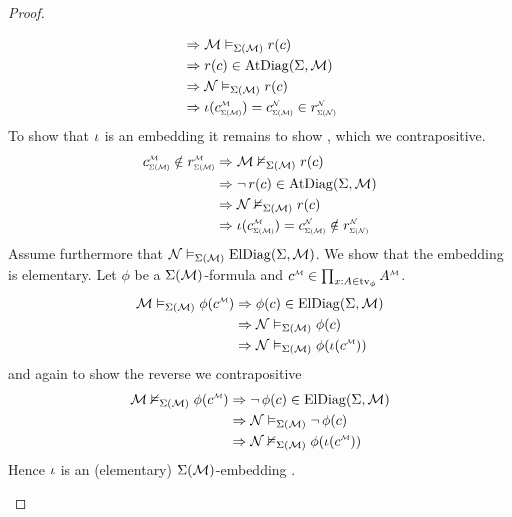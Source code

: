 \begin{proof}
\begin{forward}
\begin{align*}
            &\implies \MM \model{\Si(\MM)} r(c)\\
            &\implies r(c) \in \atdiag{\Si}{\MM}\\
            &\implies \NN \model{\Si(\MM)} r(c) \\
            &\implies \io(\subintp{\Si(\MM)}{\MM}{c}) = 
            \subintp{\Si(\MM)}{\NN}{c} \in \subintp{\Si(\NN)}{\NN}{r} 
        \end{align*}
        To show that $\iota$ is an embedding it remains to show 
        , which we contrapositive.
        \begin{align*}
            \subintp{\Si(\MM)}{\MM}{c} \notin \subintp{\Si(\MM)}{\MM}{r} 
            &\implies \MM \nodel{\Si(\MM)} r(c)\\
            &\implies \NOT r(c) \in \atdiag{\Si}{\MM}\\
            &\implies \NN \nodel{\Si(\MM)} r(c) \\
            &\implies \io(\subintp{\Si(\MM)}{\MM}{c}) = 
            \subintp{\Si(\MM)}{\NN}{c} \notin \subintp{\Si(\NN)}{\NN}{r} 
        \end{align*}
        Assume furthermore that $\mathcal{N} \vDash_{\Sigma(\mathcal{M})} \mathrm{ElDiag}(\Sigma,\mathcal{M})$.
        We show that the embedding is elementary.
        Let $\phi$ be a $\Sigma(\mathcal{M})$-formula
        and $\mmintp{c} \in \prod_{x : A \in \tv{\phi}} \mmintp{A}$.
        \begin{align*}
            \MM \model{\Si(\MM)} \phi(\mmintp{c}) 
                &\implies \phi(c) \in \eldiag{\Si}{\MM}\\
                &\implies \NN \model{\Si(\MM)} \phi(c)\\
                &\implies \NN \model{\Si(\MM)} \phi(\io(\mmintp{c}))
        \end{align*}
        and again to show the reverse we contrapositive
        \begin{align*}
            \MM \nodel{\Si(\MM)} \phi(\mmintp{c}) &\implies \NOT \phi(c) 
                \in \eldiag{\Si}{\MM}\\
            &\implies \NN \model{\Si(\MM)} \NOT \phi(c)\\
            &\implies \NN \nodel{\Si(\MM)} \phi(\io(\mmintp{c}))
        \end{align*}
        Hence $\iota$ is an (elementary) $\Sigma(\mathcal{M})$-embedding
        .
    \end{forward}


\end{proof}
